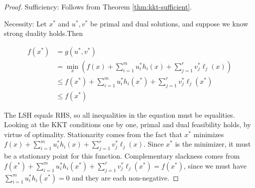 \begin{proof}

    Sufficiency: Follows from Theorem \ref{thm:kkt-sufficient}.


    Necessity: Let $ x^{*} $ and $ u^{*}, v^{*} $ be primal and dual solutions, and suppose we know strong duality holds.Then

    $$
    \begin{aligned}
    f\left(x^{*}\right) &=g\left(u^{*}, v^{*}\right) \\
    &=\min _{x}\left(f(x)+\sum_{i=1}^{m} u_{i}^{*} h_{i}(x)+\sum_{j=1}^{r} v_{j}^{*} \ell_{j}(x)\right) \\
    & \leq f\left(x^{*}\right)+\sum_{i=1}^{m} u_{i}^{*} h_{i}\left(x^{*}\right)+\sum_{j=1}^{r} v_{j}^{*} \ell_{j}\left(x^{*}\right) \\
    & \leq f\left(x^{*}\right)
    \end{aligned}
    $$

The LSH equals RHS, so all inequalities in the equation must be equalities. Looking at the KKT conditions one by one, primal and dual feasibility holds, by virtue of optimality. Stationarity comes from the fact that $ x^{*} $ minimizes $ f(x)+\sum_{i=1}^{m} u_{i}^{*} h_{i}(x)+\sum_{j=1}^{r} v_{j}^{*} \ell_{j}(x) $. Since $ x^{*} $ is the minimizer, it must be a stationary point for this function. Complementary slackness comes from $ f\left(x^{*}\right)+\sum_{i=1}^{m} u_{i}^{*} h_{i}\left(x^{*}\right)+\sum_{j=1}^{r} v_{j}^{*} \ell_{j}\left(x^{*}\right)=f\left(x^{*}\right) $, since we must have $ \sum_{i=1}^{m} u_{i}^{*} h_{i}\left(x^{*}\right)=0 $ and they are each non-negative.

\end{proof}